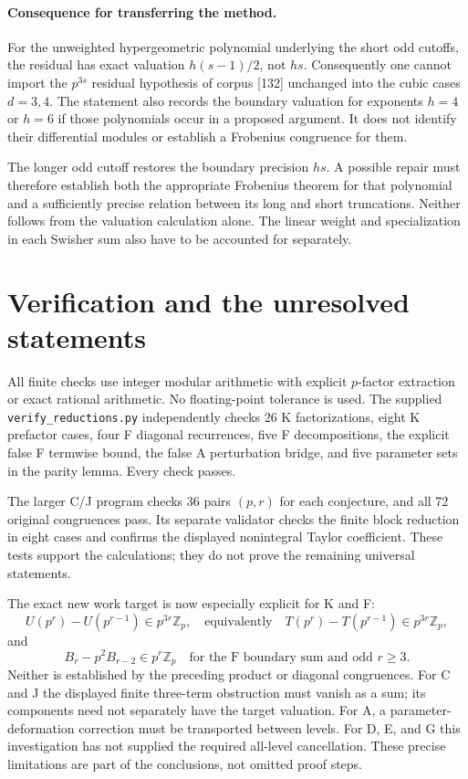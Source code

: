 \documentclass[11pt,letterpaper]{article}
\numberwithin{equation}{section}
\begin{document}
\paragraph{Consequence for transferring the method.}
For the unweighted hypergeometric polynomial underlying the short odd
cutoffs, the residual has exact valuation $h(s-1)/2$, not $hs$.
Consequently one cannot import the $p^{3s}$ residual hypothesis of
corpus [132] unchanged into the cubic cases $d=3,4$.
The statement also records the boundary valuation for exponents $h=4$
or $h=6$ if those polynomials occur in a proposed argument. It does
not identify their differential modules or establish a Frobenius
congruence for them.

The longer odd cutoff restores the boundary precision $hs$. A possible
repair must therefore establish both the appropriate Frobenius theorem
for that polynomial and a sufficiently precise relation between its
long and short truncations. Neither follows from the valuation
calculation alone. The linear weight and specialization in each
Swisher sum also have to be accounted for separately.


\section{Verification and the unresolved statements}\label{loc-I-8}
All finite checks use integer modular arithmetic with explicit $p$-factor extraction or exact rational arithmetic. No floating-point tolerance is used. The supplied \texttt{verify\_reductions.py} independently checks 26 K factorizations, eight K prefactor cases, four F diagonal recurrences, five F decompositions, the explicit false F termwise bound, the false A perturbation bridge, and five parameter sets in the parity lemma. Every check passes.

The larger C/J program checks 36 pairs $(p,r)$ for each conjecture, and all 72 original congruences pass. Its separate validator checks the finite block reduction in eight cases and confirms the displayed nonintegral Taylor coefficient. These tests support the calculations; they do not prove the remaining universal statements.

The exact new work target is now especially explicit for K and F:
\[
 U(p^r)-U(p^{r-1})\in p^{3r}\mathbb Z_p,\quad
 \text{equivalently}\quad T(p^r)-T(p^{r-1})\in p^{3r}\mathbb Z_p,
\]
and
\[
 B_r-p^2 B_{r-2}\in p^r\mathbb Z_p\quad \text{for the F boundary sum and odd } r\ge3.
\]
Neither is established by the preceding product or diagonal congruences. For C and J the displayed finite three-term obstruction must vanish as a sum; its components need not separately have the target valuation. For A, a parameter-deformation correction must be transported between levels. For D, E, and G this investigation has not supplied the required all-level cancellation. These precise limitations are part of the conclusions, not omitted proof steps.
\end{document}

